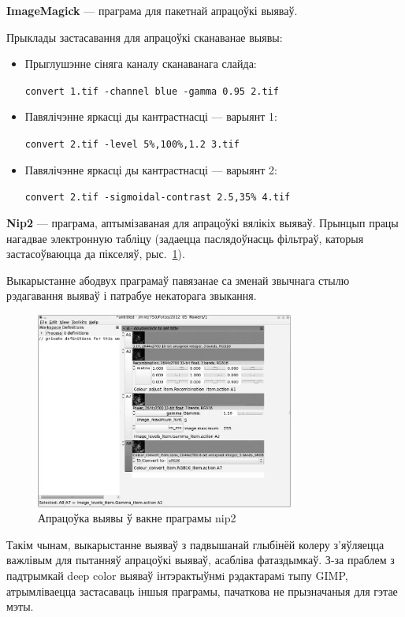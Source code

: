 \documentclass[10pt, a5paper]{article}
\begin{document}
\textbf{ImageMagick} --- праграма для пакетнай апрацоўкі выяваў.

Прыклады застасавання для апрацоўкі сканаванае выявы:
\begin{itemize}
 \item Прыглушэнне сіняга каналу сканаванага слайда:

 \texttt{convert 1.tif -channel blue -gamma 0.95 2.tif}

\item Павялічэнне яркасці ды кантрастнасці --- варыянт 1:

 \texttt{convert 2.tif -level 5\%,100\%,1.2 3.tif}

\item Павялічэнне яркасці ды кантрастнасці --- варыянт 2:

 \texttt{convert 2.tif -sigmoidal-contrast 2.5,35\% 4.tif}

\end{itemize}

\textbf{Nip2} --- праграма, аптымізаваная для апрацоўкі вялікіх выяваў. Прынцып працы нагадвае электронную табліцу (задаецца паслядоўнасць фільтраў, каторыя застасоўваюцца да пікселяў, рыс.~\ref{fig:nip2}).

Выкарыстанне абодвух праграмаў павязанае са зменай звычнага стылю рэдагавання выяваў і патрабуе некаторага звыкання.

\begin{figure}[htpb]
\centering
 \includegraphics[width=85mm]{LAS_LVEE_2012_nip2_gs.jpg}
 \caption{Апрацоўка выявы ў вакне праграмы nip2}
 \label{fig:nip2}
\end{figure}
Такім чынам, выкарыстанне выяваў з падвышанай глыбінёй колеру з'яўляецца важлівым для пытанняў апрацоўкі выяваў, асабліва фатаздымкаў. З-за праблем з падтрымкай deep color выяваў інтэрактыўнмi рэдактарамi тыпу GIMP, атрымліваецца застасаваць іншыя праграмы, пачаткова не прызначаныя для гэтае мэты.
\end{document}
